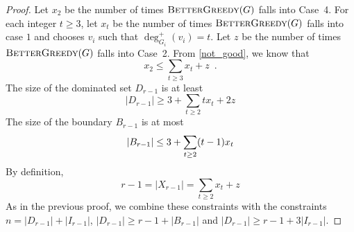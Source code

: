 \documentclass[12pt]{article}
\begin{document}
\begin{proof}
  Let $x_2$ be the number of times $\textsc{BetterGreedy}(G)$ falls into Case~4.
  For each integer $t\ge 3$, let $x_t$ be the number of times $\textsc{BetterGreedy}(G)$ falls into case $1$ and chooses $v_i$ such that $\deg^+_{G_i}(v_i)=t$.  Let $z$ be the number of times $\textsc{BetterGreedy}(G)$ falls into Case~2.  From \cref{not_good}, we know that
  \begin{equation}
      x_2 \le \sum_{t\ge 3}x_t + z \enspace .
  \end{equation}
  The size of the dominated set $D_{r-1}$ is at least
  \[
    |D_{r-1}| \ge 3 + \sum_{t\ge 2}tx_t + 2z
  \]
  The size of the boundary $B_{r-1}$ is at most
  \begin{equation}
       |B_{r-1}| \le 3 + \sum_{t\ge 2} (t-1)x_t \\
  \end{equation}
  By definition,
  \[
     r-1 = |X_{r-1}| = \sum_{t\ge 2} x_t + z
  \]
  As in the previous proof, we combine these constraints with the constraints $n=|D_{r-1}|+|I_{r-1}|$,  $|D_{r-1}|\ge r-1+|B_{r-1}|$ and $|D_{r-1}|\ge r-1+3|I_{r-1}|$.


\end{proof}
\end{document}
